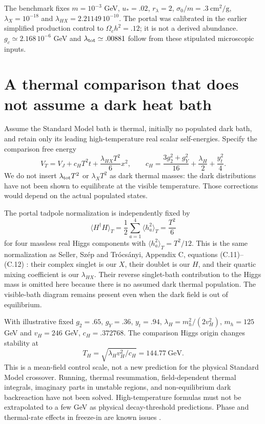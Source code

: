 \documentclass[11pt]{article}
\newcommand{\lp}{\lambda_{HX}}
\newcommand{\lt}{\lambda_{\rm tot}}
\begin{document}
The benchmark fixes $m=10^{-3}$ GeV, $u_*=.02$, $r_\lambda=2$,
$\sigma_0/m=.3\ \mathrm{cm^2/g}$, $\lambda_X=10^{-18}$ and
$\lp=2.21149\,10^{-10}$. The portal was calibrated in the earlier
simplified production control to $\Omega_c h^2=.12$; it is not a derived
abundance. $g_c\simeq2.168\,10^{-6}$ GeV and $\lt\simeq.00881$ follow
from these stipulated microscopic inputs.

\section{A thermal comparison that does not assume a dark heat bath}
Assume the Standard Model bath is thermal, initially no populated dark bath,
and retain only its leading high-temperature real scalar self-energies.
Specify the comparison free energy
\begin{equation}
 V_T=V_J+c_H T^2t+\frac{\lp T^2}{6}x^2,
 \qquad
 c_H=\frac{3g_2^2+g_Y^2}{16}+\frac{\lambda_H}{2}+\frac{y_t^2}{4}.
\label{eq:VT}
\end{equation}
We do not insert $\lt T^2$ or $\lambda_XT^2$ as dark thermal masses:
the dark distributions have not been shown to equilibrate at the visible
temperature. Those corrections would depend on the actual populated states.

The portal tadpole normalization is independently fixed by
\begin{equation}
 \langle H^\dagger H\rangle_T=
 \frac12\sum_{a=1}^4\langle h_a^2\rangle_T=\frac{T^2}{6}
\end{equation}
for four massless real Higgs components with
$\langle h_a^2\rangle_T=T^2/12$. This is the same normalization as
Seller, Sz\'ep and Tr\'ocs\'anyi, Appendix C, equations (C.11)--(C.12)
\cite{seller}: their complex singlet is our $X$, their doublet is our $H$,
and their quartic mixing coefficient is our $\lp$. Their reverse singlet-bath
contribution to the Higgs mass is omitted here because there is no assumed
dark thermal population. The visible-bath diagram remains present even
when the dark field is out of equilibrium.

With illustrative fixed $g_2=.65$, $g_Y=.36$, $y_t=.94$,
$\lambda_H=m_h^2/(2v_H^2)$, $m_h=125$ GeV and $v_H=246$ GeV,
$c_H=.372768$. The comparison Higgs origin changes stability at
\begin{equation}
 T_H=\sqrt{\lambda_Hv_H^2/c_H}=144.77\ \mathrm{GeV}.
\end{equation}
This is a mean-field control scale, not a new prediction for the physical
Standard Model crossover. Running, thermal resummation, field-dependent
thermal integrals, imaginary parts in unstable regions, and non-equilibrium
dark backreaction have not been solved. High-temperature formulas must not
be extrapolated to a few GeV as physical decay-threshold predictions.
Phase and thermal-rate effects in freeze-in are known issues \cite{deromeri}.
\end{document}
